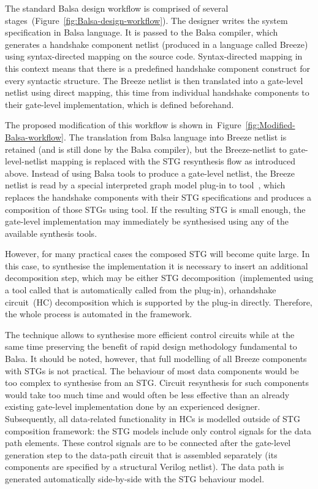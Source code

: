 The standard Balsa design workflow is comprised of several stages~(Figure~\ref{fig:Balsa-design-workflow}).
The designer writes the system specification in Balsa language. It
is passed to the Balsa compiler, which generates a handshake component
netlist (produced in a language called Breeze) using syntax-directed
mapping on the source code. Syntax-directed mapping in this context
means that there is a predefined handshake component construct for
every syntactic structure. The Breeze netlist is then translated into
a gate-level netlist using direct mapping, this time from individual
handshake components to their gate-level implementation, which is
defined beforehand.

The proposed modification of this workflow is shown in~Figure~\ref{fig:Modified-Balsa-workflow}.
The translation from Balsa language into Breeze netlist is retained
(and is still done by the Balsa compiler), but the Breeze-netlist
to gate-level-netlist mapping is replaced with the STG resynthesis
flow as introduced above. Instead of
using Balsa tools to produce a gate-level netlist, the Breeze netlist
is read by a special interpreted graph model plug-in to tool~\cite{DBLP:conf/apn/PoliakovKY09}, which replaces the handshake
components with their STG specifications and produces a composition
of those STGs using  tool. If the resulting STG is small
enough, the gate-level implementation may immediately be synthesised
using any of the available synthesis tools.

However, for many practical cases the composed STG will become quite
large. In this case, to synthesise the implementation it is necessary
to insert an additional decomposition step, which may be either STG
decomposition~(implemented using a tool called \cite{DesiJ}
that is automatically called from the plug-in), or\noun{ }handshake
circuit~(HC) decomposition which is supported by the plug-in directly.
Therefore, the whole process is automated in the framework.

The technique allows to synthesise more efficient control circuits
while at the same time preserving the benefit of rapid design methodology
fundamental to Balsa. It should be noted, however, that full modelling
of all Breeze components with STGs is not practical. The behaviour
of most data components would be too complex to synthesise from an
STG. Circuit resynthesis for such components would take too much time
and would often be less effective than an already existing gate-level
implementation done by an experienced designer. Subsequently, all
data-related functionality in HCs is modelled outside of STG composition
framework: the STG models include only control signals for the data
path elements. These control signals are to be connected after the
gate-level generation step to the data-path circuit that is assembled
separately (its components are specified by a structural Verilog netlist).
The data path is generated automatically side-by-side with the STG
behaviour model.


